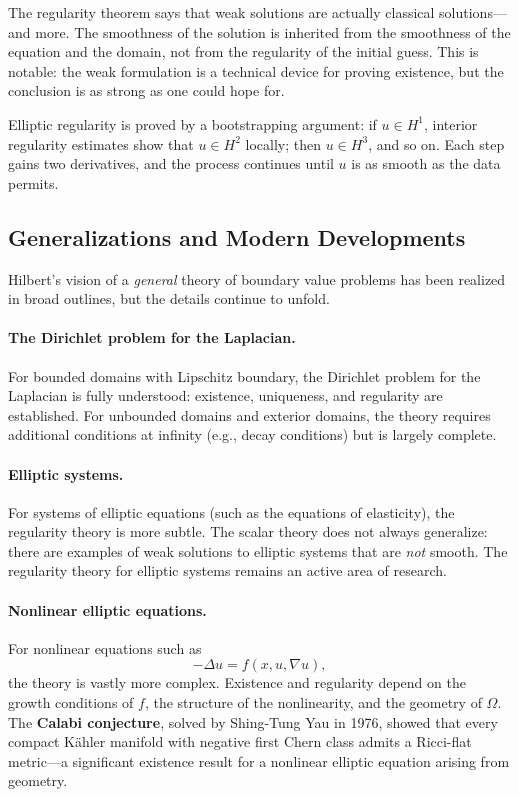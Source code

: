 The regularity theorem says that weak solutions are actually classical solutions---and more. The smoothness of the solution is inherited from the smoothness of the equation and the domain, not from the regularity of the initial guess. This is notable: the weak formulation is a technical device for proving existence, but the conclusion is as strong as one could hope for.

Elliptic regularity is proved by a bootstrapping argument: if $u \in H^1$, interior regularity estimates show that $u \in H^2$ locally; then $u \in H^3$, and so on. Each step gains two derivatives, and the process continues until $u$ is as smooth as the data permits.

\subsection{Generalizations and Modern Developments}

Hilbert's vision of a \emph{general} theory of boundary value problems has been realized in broad outlines, but the details continue to unfold.

\paragraph{The Dirichlet problem for the Laplacian.}
For bounded domains with Lipschitz boundary, the Dirichlet problem for the Laplacian is fully understood: existence, uniqueness, and regularity are established. For unbounded domains and exterior domains, the theory requires additional conditions at infinity (e.g., decay conditions) but is largely complete.

\paragraph{Elliptic systems.}
For systems of elliptic equations (such as the equations of elasticity), the regularity theory is more subtle. The scalar theory does not always generalize: there are examples of weak solutions to elliptic systems that are \emph{not} smooth. The regularity theory for elliptic systems remains an active area of research.

\paragraph{Nonlinear elliptic equations.}
For nonlinear equations such as
\[
    -\Delta u = f(x, u, \nabla u),
\]
the theory is vastly more complex. Existence and regularity depend on the growth conditions of $f$, the structure of the nonlinearity, and the geometry of $\Omega$. The \textbf{Calabi conjecture}, solved by Shing-Tung Yau in 1976, showed that every compact K\"ahler manifold with negative first Chern class admits a Ricci-flat metric---a significant existence result for a nonlinear elliptic equation arising from geometry.


